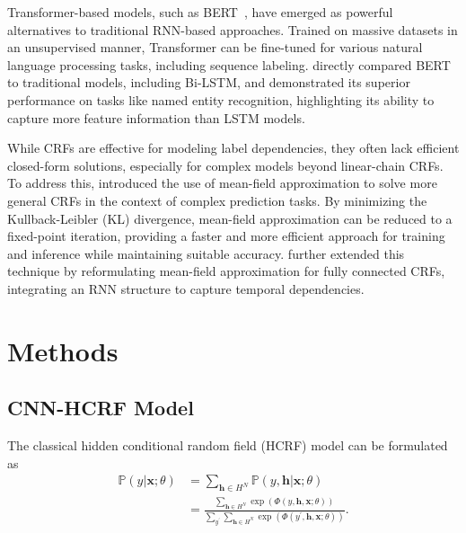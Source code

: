 \documentclass[conference]{IEEEtran}
\newcommand{\PP}{{\mathbb{P}}}
\newcommand{\hb}{\mathbf{h}}
\newcommand{\xb}{\mathbf{x}}
\begin{document}
Transformer-based models, such as BERT~\citep{devlin2019bert},
have emerged as powerful alternatives to traditional RNN-based approaches.
Trained on massive datasets in an unsupervised manner, Transformer can be
fine-tuned for various natural language processing tasks,
including sequence labeling.
\citet{devlin2019bert} directly compared BERT to traditional models, including
Bi-LSTM, and demonstrated its superior performance on tasks like named entity
recognition, highlighting its ability to capture more feature information
than LSTM models.


While CRFs are effective for modeling label dependencies, they often lack
efficient closed-form solutions, especially for complex models beyond
linear-chain CRFs. To address this, \citet{krahenbuhl2011efficient} introduced
the use of mean-field approximation to solve more general CRFs in the context
of complex prediction tasks. By minimizing the Kullback-Leibler (KL)
divergence, mean-field approximation can be reduced to a fixed-point iteration,
providing a faster and more efficient approach for training and inference
while maintaining suitable accuracy. \citet{zheng2015conditional} further
extended this technique by reformulating mean-field approximation for fully
connected CRFs, integrating an RNN structure to capture temporal dependencies.


\section{Methods}


\subsection{CNN-HCRF Model}

The classical hidden conditional random field (HCRF) model can be formulated as
\begin{equation}
\begin{split}
\PP(y \vert \xb; \theta) &= \sum_{\hb \in H^N}
\mathbb{P}(y, \hb \vert \xb; \theta) \\
&= \frac{\sum_{\hb \in H^N} \exp\left(\Phi(y, \hb, \xb; \theta)\right)}
{\sum_{y^\prime} \sum_{\hb \in H^N}
\exp\left(\Phi(y^\prime, \hb, \xb; \theta)\right)}.
\end{split}
\end{equation}
\end{document}
